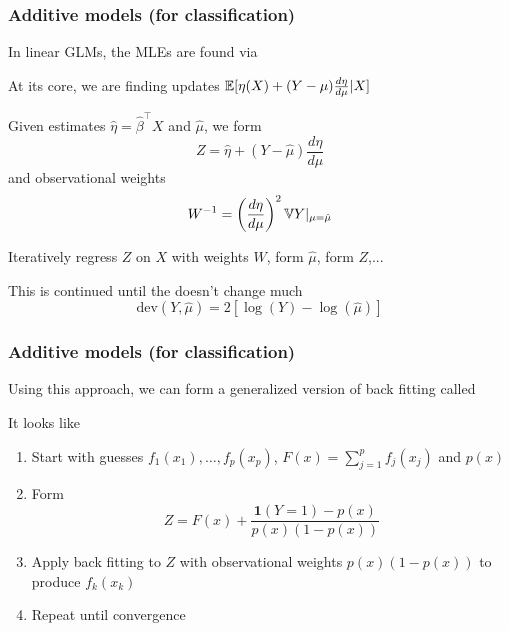 \documentclass[12pt]{beamer}
\begin{document}
\begin{frame}[fragile]
\frametitle{Additive models (for classification)}
In linear GLMs, the MLEs are found via 
\vsp

At its core, we are finding updates $\mathbb{E}[ \eta(X) + (Y-\mu)\frac{d\eta}{d\mu} | X]$

\vsp
Given estimates $\hat{\eta} =\hat\beta^{\top}X$ and $\hat\mu$, we form 
\[
Z = \hat\eta + (Y - \hat\mu)\frac{d\eta}{d\mu}
\]
and observational weights
\[
W^{-1} = \left( \frac{d\eta}{d\mu}\right)^2\mathbb{V} Y|_{\mu = \hat\mu}
\]

\vsp
Iteratively regress $Z$ on $X$ with weights $W$, form $\hat\mu$, form $Z$,...

\vsp
This is continued until the  doesn't change much
\[
\textrm{dev}(Y,\hat\mu) = 2[\log(Y) - \log(\hat\mu)]
\]
\end{frame}


\begin{frame}[fragile]
\frametitle{Additive models (for classification)}
Using this approach, we can form a generalized version of back fitting called 

\vsp
It looks like
\begin{enumerate}
\item Start with guesses $f_1(x_1),\ldots,f_p(x_p)$, $F(x) = \sum_{j=1}^p f_j(x_j)$ and $p(x)$
\item Form 
\[
Z = F(x) + \frac{\mathbf{1}(Y = 1) - p(x)}{p(x)(1-p(x))}
\]
\item Apply back fitting to $Z$ with observational weights $p(x)(1-p(x))$ to produce $f_k(x_k)$


\item Repeat until convergence
\end{enumerate}
\end{frame}
\end{document}
